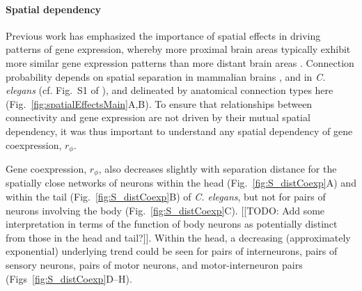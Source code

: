 \documentclass[10pt,letterpaper]{article}
\begin{document}
\paragraph{Spatial dependency}
Previous work has emphasized the importance of spatial effects in driving patterns of gene expression, whereby more proximal brain areas typically exhibit more similar gene expression patterns than more distant brain areas \cite{Krienen2016, Fulcher:2016ck, Pantazatos:2016ir, Richiardi:2017hb}.
Connection probability depends on spatial separation in mammalian brains \cite{Henderson:2014fg, Horvat:2016ia, Wang:2016gg, Markov:2013jo}, and in \emph{C. elegans} (cf. Fig.~S1 of \cite{Azulay:2016cg}), and delineated by anatomical connection types here (Fig.~\ref{fig:spatialEffectsMain}A,B).
To ensure that relationships between connectivity and gene expression are not driven by their mutual spatial dependency, it was thus important to understand any spatial dependency of gene coexpression, $r_\phi$.

Gene coexpression, $r_\phi$, also decreases slightly with separation distance for the spatially close networks of neurons within the head (Fig.~\ref{fig:S_distCoexp}A) and within the tail (Fig.~\ref{fig:S_distCoexp}B) of \emph{C. elegans}, but not for pairs of neurons involving the body (Fig.~\ref{fig:S_distCoexp}C).
[[TODO: Add some interpretation in terms of the function of body neurons as potentially distinct from those in the head and tail?]].
Within the head, a decreasing (approximately exponential) underlying trend could be seen for pairs of interneurons, pairs of sensory neurons, pairs of motor neurons, and motor-interneuron pairs (Figs~\ref{fig:S_distCoexp}D--H).
\end{document}
